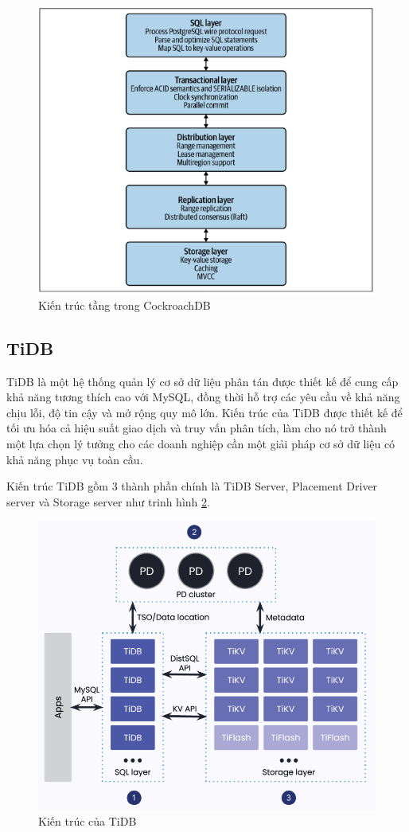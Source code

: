 \documentclass[14pt]{article}
\begin{document}
\begin{figure}
    \centering
    \includegraphics[width=0.8\linewidth]{images/layercrdb.png}
    \caption{Kiến trúc tầng trong CockroachDB \cite{CockroachDBGuide}}
    \label{fig:layercrdb}
\end{figure}


\subsection{TiDB}

TiDB là một hệ thống quản lý cơ sở dữ liệu phân tán được thiết kế để cung cấp khả năng tương thích cao với MySQL, đồng thời hỗ trợ các yêu cầu về khả năng chịu lỗi, độ tin cậy và mở rộng quy mô lớn. Kiến trúc của TiDB được thiết kế để tối ưu hóa cả hiệu suất giao dịch và truy vấn phân tích, làm cho nó trở thành một lựa chọn lý tưởng cho các doanh nghiệp cần một giải pháp cơ sở dữ liệu có khả năng phục vụ toàn cầu.

Kiến trúc TiDB gồm 3 thành phần chính là TiDB Server, Placement Driver server và Storage server như trinh hình \ref{fig:TiDBArchiteture}.


\begin{figure}
    \centering
    \includegraphics[width=0.6\linewidth]{images/TiDBArchiteture.png}
    \caption{Kiến trúc của TiDB\protect\footnotemark}
    \label{fig:TiDBArchiteture}
\end{figure}
\end{document}
